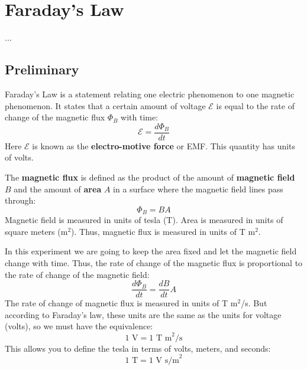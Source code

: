 \chapter{Faraday's Law}
...
\section{Preliminary}
Faraday's Law is a statement relating one electric phenomenon to one magnetic phenomenon. It states that a certain amount of voltage $\mathcal{E}$ is equal to the rate of change of the magnetic flux $\Phi_{B}$ with time:
\begin{equation}
	\mathcal{E} = \frac{d \Phi_{B}}{d t}
	\label{eq.04.faradays.law}
\end{equation}
Here $\mathcal{E}$ is known as the \textbf{electro-motive force} or EMF. This quantity has units of volts.

The \textbf{magnetic flux} is defined as the product of the amount of \textbf{magnetic field} $B$ and the amount of \textbf{area} $A$ in a surface where the magnetic field lines pass through:
\begin{equation}
	\Phi_{B} = B A
\end{equation}
Magnetic field is measured in units of tesla (T). Area is measured in units of square meters (m$^{2}$). Thus, magnetic flux is measured in units of T m$^{2}$.

In this experiment we are going to keep the area fixed and let the magnetic field change with time. Thus, the rate of change of the magnetic flux is proportional to the rate of change of the magnetic field:
\begin{equation}
	\frac{d \Phi_{B}}{d t} = \frac{d B}{d t} A
	\label{eq.04.flux.rate}
\end{equation}
The rate of change of magnetic flux is measured in units of T m$^{2}$/s. But according to Faraday's law, these units are the same as the units for voltage (volts), so we must have the equivalence:
\begin{equation}
	1 \text{ V} = 1 \text{ T m}^{2}\text{/s}
\end{equation}
This allows you to define the tesla in terms of volts, meters, and seconds:
\begin{equation}
	1 \text{ T} = 1 \text{ V s/m}^2
\end{equation}


